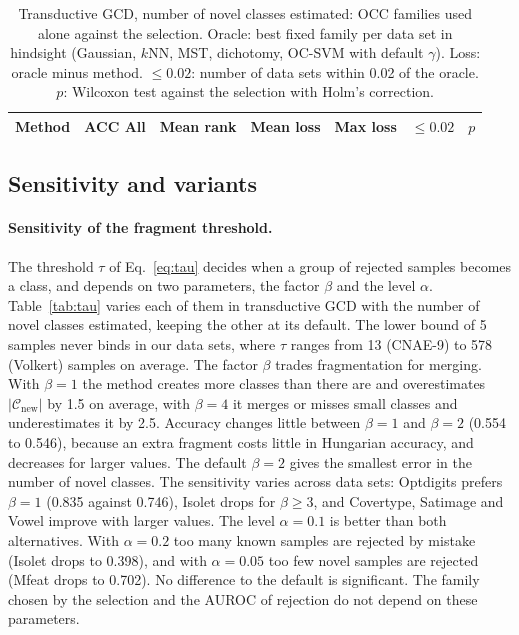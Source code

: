 \documentclass[pdflatex,sn-basic]{sn-jnl}
\newcommand{\Cnew}{\mathcal{C}_{\mathrm{new}}}
\begin{document}
\begin{table}[t]
\caption{Transductive GCD, number of novel classes estimated: OCC families used alone against the selection. Oracle: best fixed family per data set in hindsight (Gaussian, $k$NN, MST, dichotomy, OC-SVM with default $\gamma$). Loss: oracle minus method. $\le 0.02$: number of data sets within 0.02 of the oracle. $p$: Wilcoxon test against the selection with Holm's correction.}\label{tab:families}
\centering\footnotesize
\begin{tabular}{@{}lrrrrrr@{}}
\toprule
Method & ACC All & Mean rank & Mean loss & Max loss & $\le 0.02$ & $p$ \\
\midrule

\end{tabular}
\end{table}

\subsection{Sensitivity and variants}\label{sec:ablation}

\paragraph{Sensitivity of the fragment threshold.} The threshold $\tau$ of Eq.~\eqref{eq:tau} decides when a group of rejected samples becomes a class, and depends on two parameters, the factor $\beta$ and the level $\alpha$. Table~\ref{tab:tau} varies each of them in transductive GCD with the number of novel classes estimated, keeping the other at its default. The lower bound of 5 samples never binds in our data sets, where $\tau$ ranges from 13 (CNAE-9) to 578 (Volkert) samples on average. The factor $\beta$ trades fragmentation for merging. With $\beta = 1$ the method creates more classes than there are and overestimates $|\Cnew|$ by 1.5 on average, with $\beta = 4$ it merges or misses small classes and underestimates it by 2.5. Accuracy changes little between $\beta = 1$ and $\beta = 2$ (0.554 to 0.546), because an extra fragment costs little in Hungarian accuracy, and decreases for larger values. The default $\beta = 2$ gives the smallest error in the number of novel classes. The sensitivity varies across data sets: Optdigits prefers $\beta = 1$ (0.835 against 0.746), Isolet drops for $\beta \ge 3$, and Covertype, Satimage and Vowel improve with larger values. The level $\alpha = 0.1$ is better than both alternatives. With $\alpha = 0.2$ too many known samples are rejected by mistake (Isolet drops to 0.398), and with $\alpha = 0.05$ too few novel samples are rejected (Mfeat drops to 0.702). No difference to the default is significant. The family chosen by the selection and the AUROC of rejection do not depend on these parameters.
\end{document}
